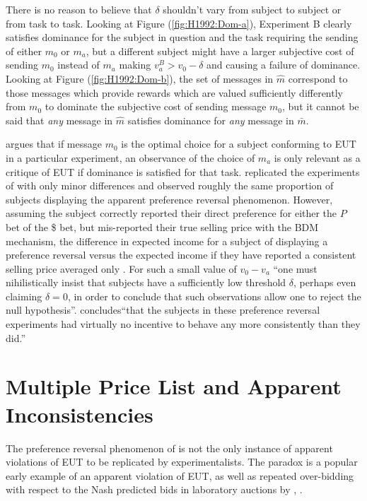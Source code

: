 \documentclass[../main.tex]{subfiles}
\begin{document}
There is no reason to believe that $\delta$ shouldn't vary from subject to subject or from task to task.
Looking at Figure (\ref{fig:H1992:Dom-a}), Experiment B clearly satisfies dominance for the subject in question and the task requiring the sending of either $m_0$ or $m_a$, but a different subject might have a larger subjective cost of sending $m_0$ instead of $m_a$ making $v_a^B > v_0 - \delta$ and causing a failure of dominance.
Looking at Figure (\ref{fig:H1992:Dom-b}), the set of messages in $\hat{m}$ correspond to those messages which provide rewards which are valued sufficiently differently from $m_0$ to dominate the subjective cost of sending message $m_0$, but it cannot be said that \textit{any} message in $\hat{m}$ satisfies dominance for \textit{any} message in $\bar{m}$.

\textcite{Harrison1989} argues that if message $m_0$ is the optimal choice for a subject conforming to EUT in a particular experiment, an observance of the choice of $m_a$ is only relevant as a critique of EUT if dominance is satisfied for that task.
\textcite{Harrison1994} replicated the experiments of\textcite{Grether1979} with only minor differences and observed roughly the same proportion of subjects displaying the apparent preference reversal phenomenon.
However, assuming the subject correctly reported their direct preference for either the $P$ bet of the {\$} bet, but mis-reported their true selling price with the BDM mechanism, the difference in expected income for a subject of displaying a preference reversal versus the expected income if they have reported a consistent selling price averaged only . 
For such a small value of $v_0 - v_a$ \enquote{one must nihilistically insist that subjects have a sufficiently low threshold $\delta$, perhaps even claiming $\delta = 0$, in order to conclude that such observations allow one to reject the null hypothesis}\parencite[1428]{Harrison1992}.
\textcite[237]{Harrison1994} concludes\enquote{that the subjects in these preference reversal experiments had virtually no incentive to behave any more consistently than they did.}

\singlespacing
\section{\texorpdfstring{\textcite{Holt2002}}{Holt \& Laury (2002)} Multiple Price List and Apparent Inconsistencies}
\doublespacing

The preference reversal phenomenon of \textcite{Grether1979} is not the only instance of apparent violations of EUT to be replicated by experimentalists.
The \textcite{Ellsberg1961} paradox is a popular early example of an apparent violation of EUT, as well as repeated over-bidding with respect to the Nash predicted bids in laboratory auctions by \textcite{Cox1982}, \textcite{Cox1983, Cox1983a, Cox1988}.
\end{document}
